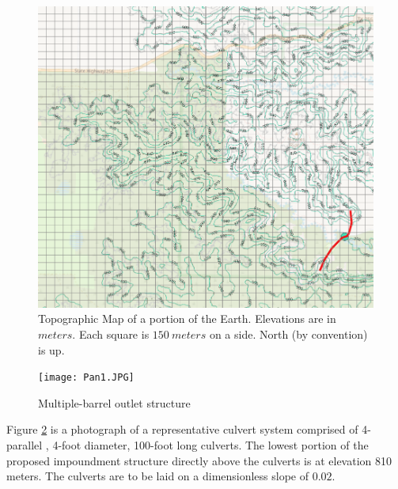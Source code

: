 \documentclass[12pt]{article}
\begin{document}
\begin{enumerate}
\begin{figure}[h!] %
   \centering
   \includegraphics[width=6.5in]{image_with_grid.png} 
   \caption{Topographic Map of a portion of the Earth.  Elevations are in $meters$.  Each square is $150~meters$ on a side. North (by convention) is up.}
   \label{fig:topoMap.jpg}
\end{figure}

\begin{figure}[h!] %
   \centering
   \texttt{[image: Pan1.JPG]} 
   \caption{Multiple-barrel outlet structure}
   \label{fig:Pan1.JPG}
\end{figure}

Figure \ref{fig:Pan1.JPG} is a photograph of a representative culvert system comprised of 4-parallel , 4-foot diameter, 100-foot long culverts.  The lowest portion of the proposed impoundment structure directly above the culverts is at elevation 810 meters.  The culverts are to be laid on a dimensionless slope of $0.02$.


\end{enumerate}
\end{document}
